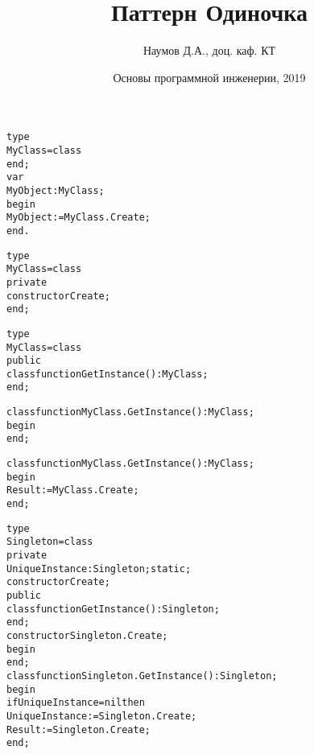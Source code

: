 \documentclass{beamer}
\title[Software Design]{Паттерн Одиночка}
\author{Наумов Д.А., доц. каф. КТ}
\date[03.12.2019] {Основы программной инженерии, 2019}
\begin{document}
\begin{frame}[fragile]
\begin{alltt}
type
  MyClass = class
  end;
var
  MyObject: MyClass;
begin
  MyObject := MyClass.Create;
end.
\end{alltt}
\end{frame}

\begin{frame}[fragile]
\begin{alltt}
type
  MyClass = class
    private
      constructor Create;
  end;
\end{alltt}
\end{frame}

\begin{frame}[fragile]
\begin{alltt}
type
  MyClass = class
    public
      class function GetInstance(): MyClass;
  end;

class function MyClass.GetInstance(): MyClass;
begin
end;
\end{alltt}
\end{frame}

\begin{frame}[fragile]
\begin{alltt}
class function MyClass.GetInstance(): MyClass;
begin
  Result := MyClass.Create;
end;
\end{alltt}
\end{frame}

\begin{frame}[fragile]
\begin{alltt}
type
  Singleton = class
    private
      UniqueInstance: Singleton; static;
      constructor Create;
    public
      class function GetInstance(): Singleton;
  end;
constructor Singleton.Create;
begin
end;
class function Singleton.GetInstance(): Singleton;
begin
  if UniqueInstance = nil then
    UniqueInstance := Singleton.Create;
  Result := Singleton.Create;
end; 
\end{alltt}
\end{frame}
\end{document}

